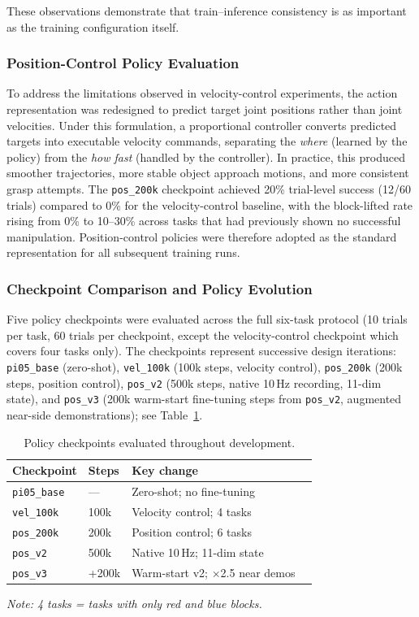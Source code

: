 \documentclass[12pt]{article}
\begin{document}
These observations demonstrate that train--inference consistency is as important as the training configuration itself.

\subsubsection{Position-Control Policy Evaluation}

To address the limitations observed in velocity-control experiments, the action representation was redesigned to predict target joint positions rather than joint velocities. Under this formulation, a proportional controller converts predicted targets into executable velocity commands, separating the \emph{where} (learned by the policy) from the \emph{how fast} (handled by the controller). In practice, this produced smoother trajectories, more stable object approach motions, and more consistent grasp attempts. The \texttt{pos\_200k} checkpoint achieved 20\% trial-level success (12/60 trials) compared to 0\% for the velocity-control baseline, with the block-lifted rate rising from 0\% to 10--30\% across tasks that had previously shown no successful manipulation. Position-control policies were therefore adopted as the standard representation for all subsequent training runs.

\subsubsection{Checkpoint Comparison and Policy Evolution}

Five policy checkpoints were evaluated across the full six-task protocol (10 trials per task, 60 trials per checkpoint, except the velocity-control checkpoint which covers four tasks only). The checkpoints represent successive design iterations: \texttt{pi05\_base} (zero-shot), \texttt{vel\_100k} (100k steps, velocity control), \texttt{pos\_200k} (200k steps, position control), \texttt{pos\_v2} (500k steps, native 10\,Hz recording, 11-dim state), and \texttt{pos\_v3} (200k warm-start fine-tuning steps from \texttt{pos\_v2}, augmented near-side demonstrations); see Table~\ref{tab:checkpoints}.

\begin{table}[H]
\centering
\caption{Policy checkpoints evaluated throughout development.}
\label{tab:checkpoints}
\begin{tabularx}{\linewidth}{lllX}
\toprule
\textbf{Checkpoint} & \textbf{Steps} & \textbf{Key change} \\
\midrule
\texttt{pi05\_base} & --- & Zero-shot; no fine-tuning \\
\texttt{vel\_100k} & 100k & Velocity control; 4 tasks \\
\texttt{pos\_200k} & 200k & Position control; 6 tasks \\
\texttt{pos\_v2} & 500k & Native 10\,Hz; 11-dim state \\
\texttt{pos\_v3} & +200k & Warm-start v2; $\times$2.5 near demos \\
\bottomrule
\end{tabularx}
\par\footnotesize\emph{Note: 4 tasks = tasks with only red and blue blocks.}
\end{table}
\end{document}

